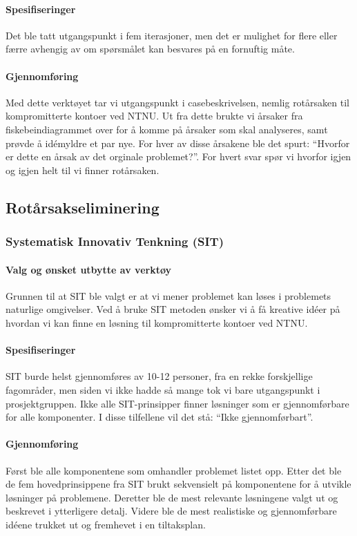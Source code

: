 \paragraph{Spesifiseringer}
Det ble tatt utgangspunkt i fem iterasjoner, men det er mulighet for flere eller færre avhengig av om spørsmålet kan besvares på en fornuftig måte. 

\paragraph{Gjennomføring}
Med dette verktøyet tar vi utgangspunkt i casebeskrivelsen, nemlig rotårsaken til kompromitterte kontoer ved NTNU. Ut fra dette brukte vi årsaker fra fiskebeindiagrammet over for å komme på årsaker som skal analyseres, samt prøvde å idémyldre et par nye. For hver av disse årsakene ble det spurt: ``Hvorfor er dette en årsak av det orginale problemet?''. For hvert svar spør vi hvorfor igjen og igjen helt til vi finner rotårsaken. 

\subsection{Rotårsakseliminering}

\subsubsection{Systematisk Innovativ Tenkning (SIT)}

\paragraph{Valg og ønsket utbytte av verktøy}
Grunnen til at SIT ble valgt er at vi mener problemet kan løses i problemets naturlige omgivelser. Ved å bruke SIT metoden ønsker vi å få kreative idéer på hvordan vi kan finne en løsning til kompromitterte kontoer ved NTNU. 

\paragraph{Spesifiseringer}
SIT burde helst gjennomføres av 10-12 personer, fra en rekke forskjellige fagområder, men siden vi ikke hadde så mange tok vi bare utgangspunkt i prosjektgruppen. Ikke alle SIT-prinsipper finner løsninger som er gjennomførbare for alle komponenter. I disse tilfellene vil det stå: ``Ikke gjennomførbart''. 

\paragraph{Gjennomføring}
Først ble alle komponentene som omhandler problemet listet opp. Etter det ble de fem hovedprinsippene fra SIT brukt sekvensielt på komponentene for å utvikle løsninger på problemene. Deretter ble de mest relevante løsningene valgt ut og beskrevet i ytterligere detalj. Videre ble de mest realistiske og gjennomførbare idéene trukket ut og fremhevet i en tiltaksplan.


